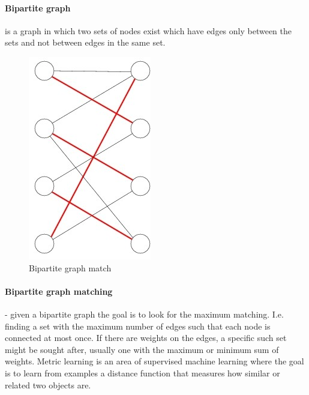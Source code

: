 \documentclass[letterpaper, 11pt]{article}
\begin{document}
\paragraph{Bipartite graph} is a graph in which two sets of nodes exist which have edges only between the sets and not between edges in the same set.
\begin{figure}
	\includegraphics[width=0.8\columnwidth]{Matching_pic_3_1_and_3_2}
	\caption{Bipartite graph match
		\label{fig:bipartite}
	}
\end{figure}
\paragraph{Bipartite graph matching}  - given a bipartite graph the goal is to look for the maximum matching. I.e. finding a set with the maximum number of edges such that each node is connected at most once. If there are weights on the edges, a specific such set might be sought after, usually one with the maximum or minimum sum of weights.
Metric learning is an area of supervised machine learning where the goal is to learn from examples a distance function that measures how similar or related two objects are. 
\end{document}
